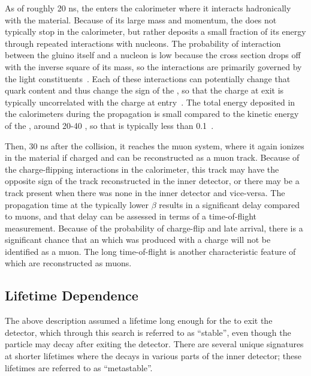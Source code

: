 As of roughly 20 ns, the \rhadron enters the calorimeter where it interacts hadronically with the material.
Because of its large mass and momentum, the \rhadron does not typically stop in the calorimeter, but rather deposits a small fraction of its energy through repeated interactions with nucleons.
The probability of interaction between the gluino itself and a nucleon is low because the cross section drops off with the inverse square of its mass, so the interactions are primarily governed by the light constituents~\cite{g4_rhad_2009}.
Each of these interactions can potentially change that quark content and thus change the sign of the \rhadron, so that the charge at exit is typically uncorrelated with the charge at entry~\cite{rhad_atlas}.
The total energy deposited in the calorimeters during the propagation is small compared to the kinetic energy of the \rhadron, around 20-40 \GeV, so that \ep is typically less than 0.1~\cite{rhad_atlas}.

Then, 30 ns after the collision, it reaches the muon system, where it again ionizes in the material if charged and can be reconstructed as a muon track.
Because of the charge-flipping interactions in the calorimeter, this track may have the opposite sign of the track reconstructed in the inner detector, or there may be a track present when there was none in the inner detector and vice-versa.
The propagation time at the typically lower $\beta$ results in a significant delay compared to muons, and that delay can be assessed in terms of a time-of-flight measurement.
Because of the probability of charge-flip and late arrival, there is a significant chance that an \rhadron which was produced with a charge will not be identified as a muon.
The long time-of-flight is another characteristic feature of \rhadrons which are reconstructed as muons.

\subsection{Lifetime Dependence}
\label{sec:rh_lifetimes}

The above description assumed a lifetime long enough for the \rhadron to exit the detector, which through this search is referred to as ``stable'', even though the particle may decay after exiting the detector.
There are several unique signatures at shorter lifetimes where the \rhadron decays in various parts of the inner detector; these lifetimes are referred to as ``metastable''.

